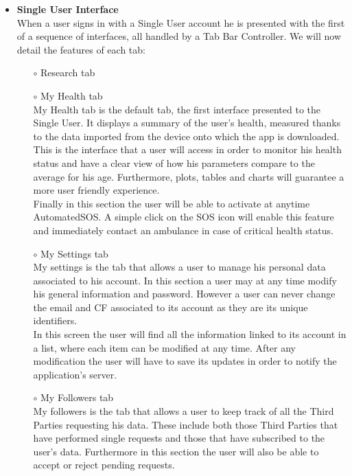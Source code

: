\documentclass[titlepage]{article}
\begin{document}
\begin{itemize}
\begin{itemize}
				\item{\bf Single User Interface} \\
			When a user signs in with a Single User account he is presented with the first of a sequence of interfaces, all handled by a Tab Bar Controller. We will now detail the features of each tab:
				\begin{itemize}
					\item[$\circ$] Research tab
					\item[$\circ$] My Health tab\\
				My Health tab is the default tab, the first interface presented to the Single User. It displays a summary of the user’s health, measured thanks to the data imported from the device onto which the app is downloaded. This is the interface that a user will access in order to monitor his health status and have a clear view of how his parameters compare to the average for his age. Furthermore, plots, tables and charts will guarantee a more user friendly experience.\\
Finally in this section the user will be able to activate at anytime AutomatedSOS. A simple click on the SOS icon will enable this feature and immediately contact an ambulance in case of critical health status.

					\item[$\circ$] My Settings tab \\
				My settings is the tab that allows a user to manage his personal data associated to his account. In this section a user may at any time modify his general information and password. However a user can never change the email and CF associated to its account as they are its unique identifiers.\\
In this screen the user will find all the information linked to its account in a list, where each item can be modified at any time. After any modification the user will have to save its updates in order to notify the application’s server.

					\item[$\circ$] My Followers tab \\
				My followers is the tab that allows a user to keep track of all the Third Parties requesting his data. These include both those Third Parties that have performed single requests and those that have subscribed to the user’s data. Furthermore in this section the user will also be able to accept or reject pending requests.

				\end{itemize}
			

\end{itemize}
\end{itemize}
\end{document}
